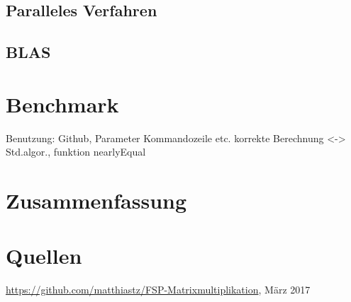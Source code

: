 \documentclass[a4paper,11pt]{scrartcl}
\begin{document}
\subsection{Paralleles Verfahren}
\subsection{BLAS}


\section{Benchmark}
Benutzung: Github, Parameter Kommandozeile etc.
korrekte Berechnung <-> Std.algor., funktion nearlyEqual

\section{Zusammenfassung}

\section{Quellen}
\begin{thebibliography}{9}

 \url{https://github.com/matthiastz/FSP-Matrixmultiplikation}, März 2017

\end{thebibliography}
\end{document}

